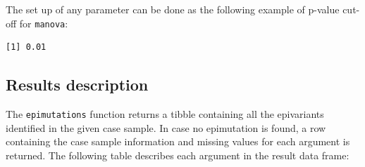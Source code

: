 \documentclass[
]{article}
\newenvironment{Shaded}{\begin{snugshade}}{\end{snugshade}}
\newcommand{\DataTypeTok}[1]{\textcolor[rgb]{0.13,0.29,0.53}{#1}}
\newcommand{\FloatTok}[1]{\textcolor[rgb]{0.00,0.00,0.81}{#1}}
\newcommand{\KeywordTok}[1]{\textcolor[rgb]{0.13,0.29,0.53}{\textbf{#1}}}
\newcommand{\NormalTok}[1]{#1}
\newcommand{\OperatorTok}[1]{\textcolor[rgb]{0.81,0.36,0.00}{\textbf{#1}}}
\newcommand{\StringTok}[1]{\textcolor[rgb]{0.31,0.60,0.02}{#1}}
\begin{document}
The set up of any parameter can be done as the following example of
p-value cut-off for \texttt{manova}:

\begin{Shaded}
\end{Shaded}

\begin{verbatim}
[1] 0.01
\end{verbatim}

\hypertarget{results-description}{%
\subsection{Results description}\label{results-description}}

The \texttt{epimutations} function returns a tibble containing all the
epivariants identified in the given case sample. In case no epimutation
is found, a row containing the case sample information and missing
values for each argument is returned. The following table describes each
argument in the result data frame:
\end{document}
